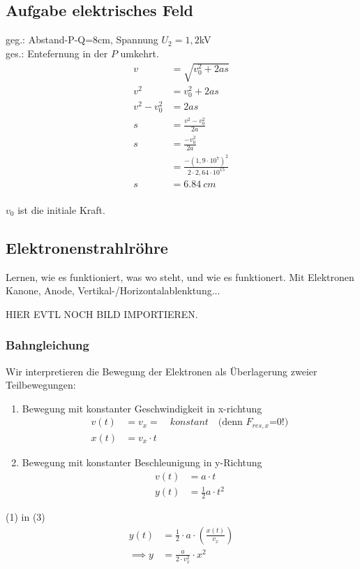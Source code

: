 \subsection{Aufgabe elektrisches Feld}
geg.: Abstand-P-Q=8cm, Spannung $U_2=1,2$kV\\
ges.: Entefernung in der $P$ umkehrt.
\begin{align*}
    v&= \sqrt{v^2_0+2as}  \\
    v^2&= v_0^2 + 2as \\
    v^2-v_0^2&= 2as \\
    s&= \frac{v^2-v_0^2}{2a} \\
    s&= \frac{-v_0^2}{2a} \\
    &= \frac{-(1,9\cdot 10^7)^2}{2\cdot 2,64\cdot 10^{15}} \\
    s&= 6.84\ cm \\
\end{align*}

$v_0$ ist die initiale Kraft.



\subsection{Elektronenstrahlr\"ohre}
Lernen, wie es funktioniert, was wo steht, und wie es funktionert.
Mit Elektronen Kanone, Anode, Vertikal-/Horizontalablenktung...

HIER EVTL NOCH BILD IMPORTIEREN.

\subsubsection{Bahngleichung}

Wir interpretieren die Bewegung der Elektronen als \"Uberlagerung zweier
Teilbewegungen:
\begin{enumerate}
    \item Bewegung mit konstanter Geschwindigkeit in x-richtung
        \begin{align}
            v(t)&=v_x =\quad  konstant \quad  \text{(denn $F_{res, x}$=0!)}\\
            x(t)&=v_x\cdot t 
        \end{align}
    \item Bewegung mit konstanter Beschleunigung in y-Richtung
        \begin{align}
            v(t)&=a\cdot t  \\
            y(t)&=\frac{1}{2}a\cdot t^2
        \end{align}
\end{enumerate}


(1) in (3)
\begin{align*}
    y(t)&= \frac{1}{2}\cdot a\cdot \left( \frac{x(t)}{v_x}\right)  \\
    \implies y &= \frac{a}{2\cdot v_x^2}\cdot x^2
\end{align*}



